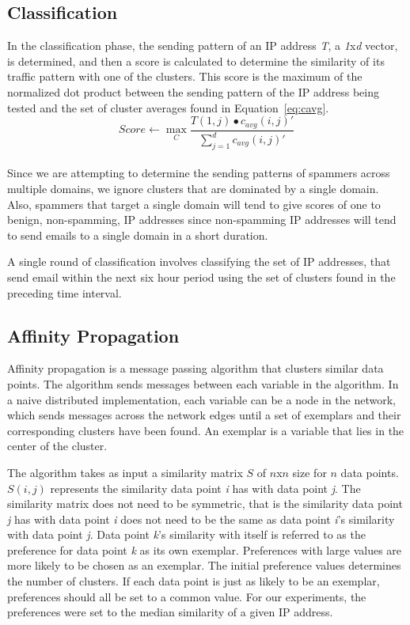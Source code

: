 \subsection{Classification}
\label{classify} 
In the classification phase, the sending pattern of an IP address \emph{T}, a \emph{1}x\emph{d} vector, is determined, and then a score is calculated to determine the similarity of its traffic pattern with one of the clusters. This score is the maximum of the normalized dot product between the sending pattern of the IP address being tested and the set of cluster averages found in Equation~\ref{eq:cavg}. 
\begin{equation}
	\displaystyle Score \leftarrow \max_{C} \frac{T(1, j) \bullet c_{avg}(i, j)'}{\sum_{j=1}^d c_{avg}(i,j)'}
	\label{eq:score}
\end{equation}
\\

Since we are attempting to determine the sending patterns of spammers across multiple domains, we ignore clusters that are dominated by a single domain. Also, spammers that target a single domain will tend to give scores of one to benign, non-spamming, IP addresses since non-spamming IP addresses will tend to send emails to a single domain in a short duration. 

A single round of classification involves classifying the set of IP addresses, that send email within the next six hour period using the set of clusters found in the preceding time interval. 

\subsection{Affinity Propagation}
\label{ap} 
Affinity propagation is a message passing algorithm that clusters similar data points. The algorithm sends messages between each variable in the algorithm. In a naive distributed implementation, each variable can be a node in the network, which sends messages across the network edges until a set of exemplars and their corresponding clusters have been found. An exemplar is a variable that lies in the center of the cluster.

The algorithm takes as input a similarity matrix $S$ of $n$x$n$ size for $n$ data points. $S(i,j)$ represents the similarity data point \emph{i} has with data point \emph{j}. The similarity matrix does not need to be symmetric, that is the similarity data point \emph{j} has with data point \emph{i} does not need to be the same as data point \emph{i}'s similarity with data point \emph{j}. Data point \emph{k}'s similarity with itself is referred to as the preference for data point \emph{k} as its own exemplar. Preferences with large values are more likely to be chosen as an exemplar. The initial preference values  determines the number of clusters. If each data point is just as likely to be an exemplar, preferences should all be set to a common value. For our experiments, the preferences were set to the median similarity of a given IP address. 

